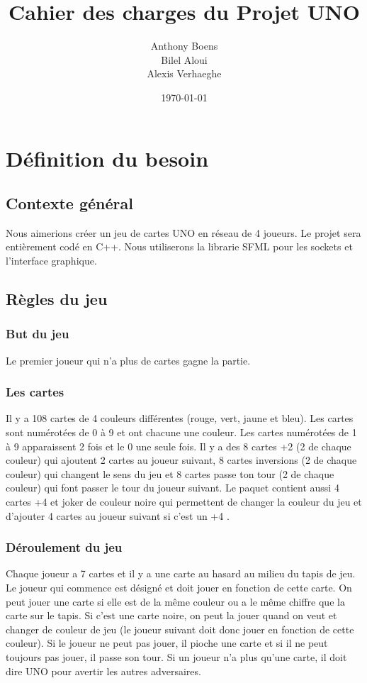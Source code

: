\documentclass[french]{article}
\begin{document}
\title{Cahier des charges du Projet UNO}
\date{\today}
\author{Anthony Boens \\  Bilel Aloui \\  Alexis Verhaeghe}
\maketitle

\section{Définition du besoin}
\subsection{Contexte général}
Nous aimerions créer un jeu de cartes UNO en réseau de 4 joueurs. Le projet sera entièrement codé en C++. Nous utiliserons la librarie SFML pour les sockets et l'interface graphique. 

\subsection{Règles du jeu}
\subsubsection{But du jeu}
Le premier joueur qui n'a plus de cartes gagne la partie.

\subsubsection{Les cartes}
Il y a 108 cartes de 4 couleurs différentes (rouge, vert, jaune et bleu). Les cartes sont numérotées de 0 à 9 et ont chacune une couleur. Les cartes numérotées de 1 à 9 apparaissent 2 fois et le 0 une seule fois.
Il y a des 8 cartes \og  +2 \fg{} (2 de chaque couleur) qui ajoutent 2 cartes au joueur suivant, 8 cartes inversions (2 de chaque couleur) qui changent le sens du jeu et 8 cartes \og passe ton tour \fg{} (2 de chaque couleur) qui font passer le tour du joueur suivant.
Le paquet contient aussi 4 cartes \og  +4 \fg{} et \og joker \fg{} de couleur noire qui permettent de changer la couleur du jeu et d'ajouter 4 cartes au joueur suivant si c'est un \og +4 \fg{}.

\subsubsection{Déroulement du jeu}
Chaque joueur a 7 cartes et il y a une carte au hasard au milieu du tapis de jeu. Le joueur qui commence est désigné et doit jouer en fonction de cette carte.
On peut jouer une carte si elle est de la même couleur ou a le même chiffre que la carte sur le tapis. Si c'est une carte noire, on peut la jouer quand on veut et changer de couleur de jeu (le joueur suivant doit donc jouer en fonction de cette couleur).
Si le joueur ne peut pas jouer, il pioche une carte et si il ne peut toujours pas jouer, il passe son tour.
Si un joueur n'a plus qu'une carte, il doit dire \og UNO\fg{} pour avertir les autres adversaires.
\end{document}
